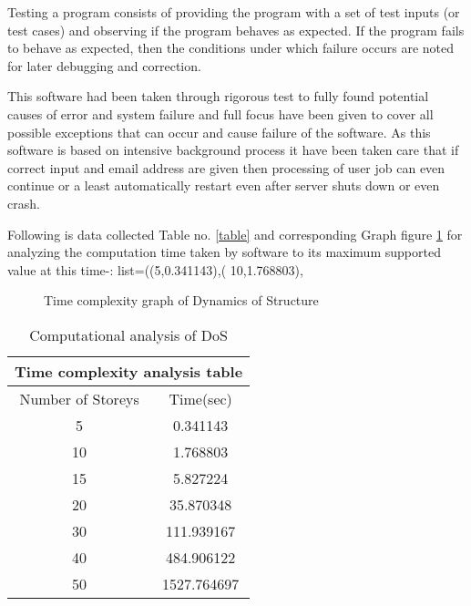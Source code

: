 Testing a program consists of providing the program with a set of test inputs (or test cases) and
observing if the program behaves as expected. If the program fails to behave as expected, then the
conditions under which failure occurs are noted for later debugging and correction. 


This software had been taken through rigorous test to fully found potential causes of error and system failure
and full focus have been given to cover all possible exceptions that can 
occur and cause failure of the software.
As this software is based on intensive background process it have been taken care that 
if correct input and email address are given then processing of user job can even continue or a least automatically 
restart even after server shuts down or even crash.

Following is data collected Table no. \ref{table} and corresponding Graph figure \ref{fig:graph} for analyzing the computation time taken by software 
to its maximum supported value at this time-:
list=((5,0.341143),(
10,1.768803),

\begin{figure}[H]
	\caption{Time complexity graph of Dynamics of Structure}
	\label{fig:graph}
\end{figure}



\begin{table}[h]
\centering
\begin{tabular}{ ||c|c|| }
\hline
 \multicolumn{2}{||c||}{Time complexity analysis table} \\
 \hline
 Number of Storeys & Time(sec) \\ [0.5ex] 
 \hline \hline
	5 & 0.341143 \\ \hline
	10 & 1.768803 \\ \hline
	15 & 5.827224 \\ \hline
	20 & 35.870348 \\ \hline
	30 & 111.939167 \\ \hline
	40 & 484.906122 \\ \hline
	50 & 1527.764697 \\ [1ex]
 \hline
\end{tabular}
\caption{Computational analysis of DoS}
\label{table2}
\end{table}

